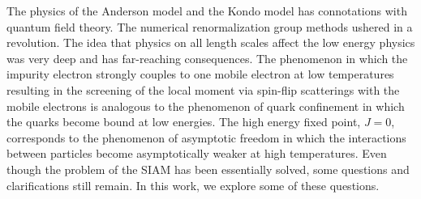 \documentclass[14pt]{extarticle}
\numberwithin{equation}{section}
\begin{document}
\pb The physics of the Anderson model and the Kondo model has connotations with quantum field theory. The numerical renormalization group methods ushered in a revolution. The idea that physics on all length scales affect the low energy physics was very deep and has far-reaching consequences. The phenomenon in which the impurity electron strongly couples to one mobile electron at low temperatures resulting in the screening of the local moment via spin-flip scatterings with the mobile electrons is analogous to the phenomenon of quark confinement in which the quarks become bound at low energies. The high energy fixed point, \(J=0\), corresponds to the phenomenon of asymptotic freedom in which the interactions between particles become asymptotically weaker at high temperatures.
\pb Even though the problem of the SIAM has been essentially solved, some questions and clarifications still remain. In this work, we explore some of these questions.
\end{document}
